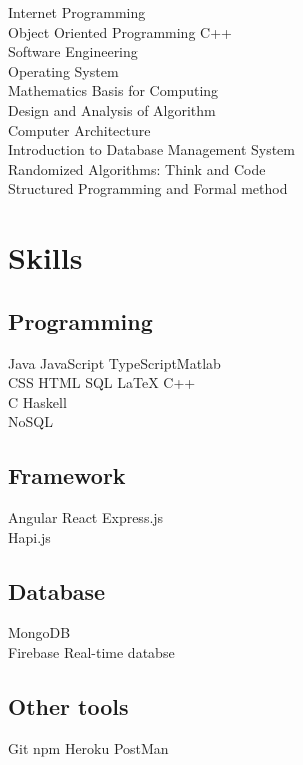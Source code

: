 \documentclass[letterpaper]{deedy-resume} %
\begin{document}
\begin{minipage}[t]{0.33\textwidth}
Internet Programming\\
Object Oriented Programming C++\\
Software Engineering\\
Operating System\\
Mathematics Basis for Computing\\
Design and Analysis of Algorithm\\
Computer Architecture\\
Introduction to Database Management System\\
Randomized Algorithms: Think and Code\\
Structured Programming and Formal method\\




\sectionspace %


\section{Skills}

\subsection{Programming}

Java \textbullet{} JavaScript \textbullet{} TypeScript\textbullet{}Matlab \\ 
CSS \textbullet{} HTML \textbullet{} SQL \textbullet{} \LaTeX \textbullet{} C++
\\C  \textbullet{} Haskell\\
NoSQL 
\subsection{Framework}
Angular \textbullet{} React \textbullet{} Express.js \\ Hapi.js
\subsection{Database}
MongoDB \\ Firebase Real-time databse
\subsection{Other tools}
Git \textbullet{} npm \textbullet{} Heroku \textbullet{} PostMan

\sectionspace %


\end{minipage} %
\end{document}

